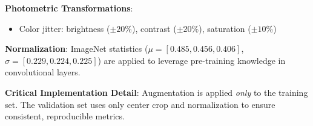 \textbf{Photometric Transformations}:
\begin{itemize}
    \item Color jitter: brightness ($\pm 20\%$), contrast ($\pm 20\%$), saturation ($\pm 10\%$)
\end{itemize}

\textbf{Normalization}: ImageNet statistics ($\mu = [0.485, 0.456, 0.406]$, $\sigma = [0.229, 0.224, 0.225]$) are applied to leverage pre-training knowledge in convolutional layers.

\textbf{Critical Implementation Detail}: Augmentation is applied \textit{only} to the training set. The validation set uses only center crop and normalization to ensure consistent, reproducible metrics.
